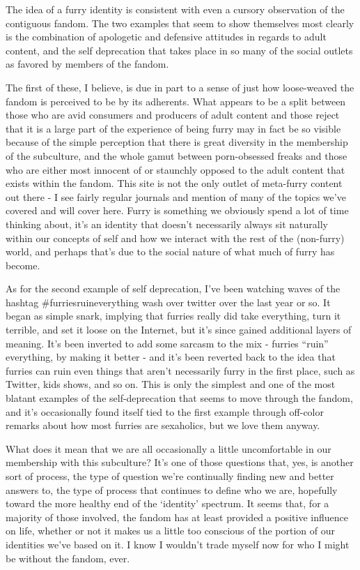 The idea of a furry identity is consistent with even a cursory observation of the contiguous fandom. The two examples that seem to show themselves most clearly is the combination of apologetic and defensive attitudes in regards to adult content, and the self deprecation that takes place in so many of the social outlets as favored by members of the fandom.

The first of these, I believe, is due in part to a sense of just how loose-weaved the fandom is perceived to be by its adherents. What appears to be a split between those who are avid consumers and producers of adult content and those reject that it is a large part of the experience of being furry may in fact be so visible because of the simple perception that there is great diversity in the membership of the subculture, and the whole gamut between porn-obsessed freaks and those who are either most innocent of or staunchly opposed to the adult content that exists within the fandom. This site is not the only outlet of meta-furry content out there - I see fairly regular journals and mention of many of the topics we've covered and will cover here. Furry is something we obviously spend a lot of time thinking about, it's an identity that doesn't necessarily always sit naturally within our concepts of self and how we interact with the rest of the (non-furry) world, and perhaps that's due to the social nature of what much of furry has become.

As for the second example of self deprecation, I've been watching waves of the hashtag \#furriesruineverything wash over twitter over the last year or so. It began as simple snark, implying that furries really did take everything, turn it terrible, and set it loose on the Internet, but it's since gained additional layers of meaning. It's been inverted to add some sarcasm to the mix - furries ``ruin'' everything, by making it better - and it's been reverted back to the idea that furries can ruin even things that aren't necessarily furry in the first place, such as Twitter, kids shows, and so on. This is only the simplest and one of the most blatant examples of the self-deprecation that seems to move through the fandom, and it's occasionally found itself tied to the first example through off-color remarks about how most furries are sexaholics, but we love them anyway.

What does it mean that we are all occasionally a little uncomfortable in our membership with this subculture? It's one of those questions that, yes, is another sort of process, the type of question we're continually finding new and better answers to, the type of process that continues to define who we are, hopefully toward the more healthy end of the `identity' spectrum. It seems that, for a majority of those involved, the fandom has at least provided a positive influence on life, whether or not it makes us a little too conscious of the portion of our identities we've based on it. I know I wouldn't trade myself now for who I might be without the fandom, ever.
